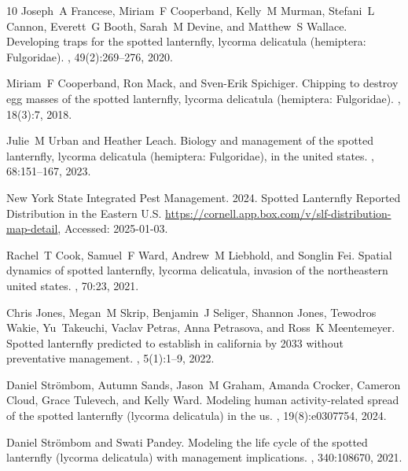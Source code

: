 \documentclass[onecolumn]{article}
\providecommand{\uppercase}[1]{\MakeUppercase{#1}}
\begin{document}
{\begin{thebibliography}{10}
Joseph~A Francese, Miriam~F Cooperband, Kelly~M Murman, Stefani~L Cannon, Everett~G Booth, Sarah~M Devine, and Matthew~S Wallace.
\newblock Developing traps for the spotted lanternfly, lycorma delicatula (hemiptera: Fulgoridae).
, 49(2):269--276, 2020.

Miriam~F Cooperband, Ron Mack, and Sven-Erik Spichiger.
\newblock Chipping to destroy egg masses of the spotted lanternfly, lycorma delicatula (hemiptera: Fulgoridae).
, 18(3):7, 2018.

Julie~M Urban and Heather Leach.
\newblock Biology and management of the spotted lanternfly, lycorma delicatula (hemiptera: Fulgoridae), in the united states.
, 68:151--167, 2023.

\uppercase{N}ew \uppercase{Y}ork \uppercase{S}tate \uppercase{I}ntegrated \uppercase{P}est \uppercase{M}anagement. 2024. \uppercase{S}potted \uppercase{L}anternfly \uppercase{R}eported \uppercase{D}istribution in the \uppercase{E}astern \uppercase{U}.\uppercase{S}.
\newblock \url{https://cornell.app.box.com/v/slf-distribution-map-detail}, {Accessed: 2025-01-03.}

Rachel~T Cook, Samuel~F Ward, Andrew~M Liebhold, and Songlin Fei.
\newblock Spatial dynamics of spotted lanternfly, lycorma delicatula, invasion of the northeastern united states.
, 70:23, 2021.

Chris Jones, Megan~M Skrip, Benjamin~J Seliger, Shannon Jones, Tewodros Wakie, Yu~Takeuchi, Vaclav Petras, Anna Petrasova, and Ross~K Meentemeyer.
\newblock Spotted lanternfly predicted to establish in california by 2033 without preventative management.
, 5(1):1--9, 2022.

Daniel Str{\"o}mbom, Autumn Sands, Jason~M Graham, Amanda Crocker, Cameron Cloud, Grace Tulevech, and Kelly Ward.
\newblock Modeling human activity-related spread of the spotted lanternfly (lycorma delicatula) in the us.
, 19(8):e0307754, 2024.

Daniel Str{\"o}mbom and Swati Pandey.
\newblock Modeling the life cycle of the spotted lanternfly (lycorma delicatula) with management implications.
, 340:108670, 2021.


\end{thebibliography}}
\end{document}
